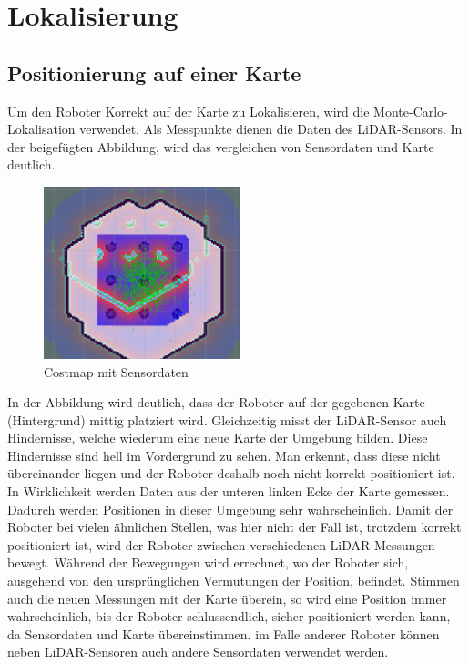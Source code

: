 \section{Lokalisierung}
{	
	\subsection{Positionierung auf einer Karte}
	{
		
	Um den Roboter Korrekt auf der Karte zu Lokalisieren, wird die Monte-Carlo-Lokalisation verwendet. Als Messpunkte dienen die Daten des LiDAR-Sensors. In der beigefügten Abbildung, wird das vergleichen von Sensordaten und Karte deutlich.
		\begin{figure}[H]
			\centering
			\includegraphics[height=5cm]{Bilder/costmap_monte_carlo_example.png}
			\caption{Costmap mit Sensordaten} 
			\label{pic:coastmontecarlo}
		\end{figure}
		In der Abbildung wird deutlich, dass der Roboter auf der gegebenen Karte (Hintergrund) mittig platziert wird. Gleichzeitig misst der LiDAR-Sensor auch Hindernisse, welche wiederum eine neue Karte der Umgebung bilden. Diese Hindernisse sind hell im Vordergrund zu sehen. Man erkennt, dass diese nicht übereinander liegen und der Roboter deshalb noch nicht korrekt positioniert ist. In Wirklichkeit werden Daten aus der unteren linken Ecke der Karte gemessen. Dadurch werden Positionen in dieser Umgebung sehr wahrscheinlich. Damit der Roboter bei vielen ähnlichen Stellen, was hier nicht der Fall ist, trotzdem korrekt positioniert ist, wird der Roboter zwischen verschiedenen LiDAR-Messungen bewegt. Während der Bewegungen wird errechnet, wo der Roboter sich, ausgehend von den ursprünglichen Vermutungen der Position, befindet. Stimmen auch die neuen Messungen mit der Karte überein, so wird eine Position immer wahrscheinlich, bis der Roboter schlussendlich, sicher positioniert werden kann, da Sensordaten und Karte übereinstimmen. im Falle anderer Roboter können neben LiDAR-Sensoren auch andere Sensordaten verwendet werden.
		
}}
